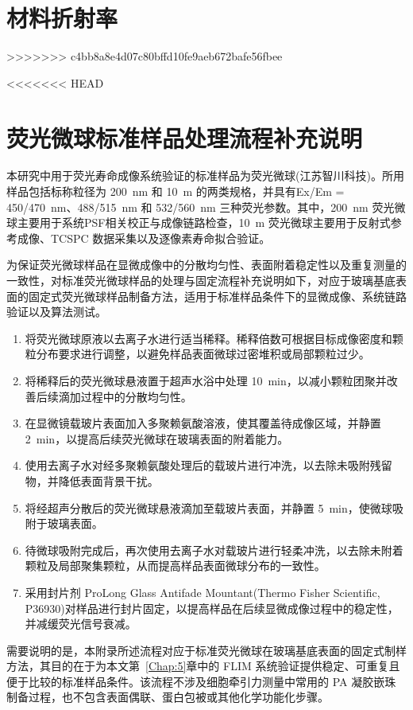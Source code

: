\chapter{材料折射率}\label{chap:app3}{
>>>>>>> c4bb8a8e4d07c80bffd10fe9aeb672bafe56fbee
\setcounter{app_fig}{1}
\setcounter{app_tab}{1}

<<<<<<< HEAD
\chapter{荧光微球标准样品处理流程补充说明}\label{app:beads_protocol}

本研究中用于荧光寿命成像系统验证的标准样品为荧光微球(江苏智川科技)。所用样品包括标称粒径为 200~nm 和 10~\textmu m 的两类规格，并具有Ex/Em = 450/470~nm、488/515~nm 和 532/560~nm 三种荧光参数。其中，200~nm 荧光微球主要用于系统PSF相关校正与成像链路检查，10~\textmu m 荧光微球主要用于反射式参考成像、TCSPC 数据采集以及逐像素寿命拟合验证。

为保证荧光微球样品在显微成像中的分散均匀性、表面附着稳定性以及重复测量的一致性，对标准荧光微球样品的处理与固定流程补充说明如下，对应于玻璃基底表面的固定式荧光微球样品制备方法，适用于标准样品条件下的显微成像、系统链路验证以及算法测试。

\begin{enumerate}
    \item 将荧光微球原液以去离子水进行适当稀释。稀释倍数可根据目标成像密度和颗粒分布要求进行调整，以避免样品表面微球过密堆积或局部颗粒过少。
    \item 将稀释后的荧光微球悬液置于超声水浴中处理 10~min，以减小颗粒团聚并改善后续滴加过程中的分散均匀性。
    \item 在显微镜载玻片表面加入多聚赖氨酸溶液，使其覆盖待成像区域，并静置 2~min，以提高后续荧光微球在玻璃表面的附着能力。
    \item 使用去离子水对经多聚赖氨酸处理后的载玻片进行冲洗，以去除未吸附残留物，并降低表面背景干扰。
    \item 将经超声分散后的荧光微球悬液滴加至载玻片表面，并静置 5~min，使微球吸附于玻璃表面。
    \item 待微球吸附完成后，再次使用去离子水对载玻片进行轻柔冲洗，以去除未附着颗粒及局部聚集颗粒，从而提高样品表面微球分布的一致性。
    \item 采用封片剂 ProLong Glass Antifade Mountant(Thermo Fisher Scientific, P36930)对样品进行封片固定，以提高样品在后续显微成像过程中的稳定性，并减缓荧光信号衰减。
\end{enumerate}

需要说明的是，本附录所述流程对应于标准荧光微球在玻璃基底表面的固定式制样方法，其目的在于为本文第~\ref{Chap:5}章中的 FLIM 系统验证提供稳定、可重复且便于比较的标准样品条件。该流程不涉及细胞牵引力测量中常用的 PA 凝胶嵌珠制备过程，也不包含表面偶联、蛋白包被或其他化学功能化步骤。

}
